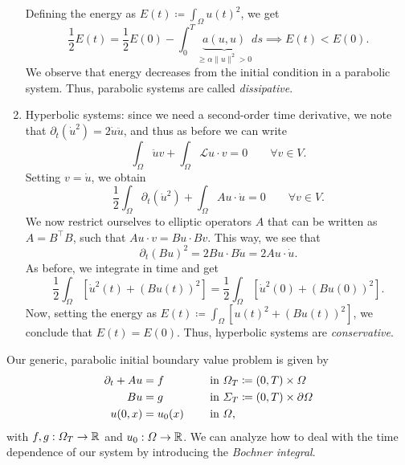 \begin{enumerate}
    Defining the energy as $E(t) \coloneqq \int_\Omega u(t)^2$, we get
    \begin{equation}
        \frac{1}{2}E(t) = \frac{1}{2}E(0) - \int_0^T \underbrace{a(u,u)}_{\geq \alpha\|u\|^2>0} ds \implies \boxed{E(t) < E(0)}.
    \end{equation}
    We observe that energy decreases from the initial condition in a parabolic system. Thus, parabolic systems are called \emph{dissipative}.
    \item Hyperbolic systems: since we need a second-order time derivative, we note that $\partial_t(\dot{u}^2) = 2\dot{u}\ddot{u}$, and thus as before we can write
    \begin{equation}
        \int_\Omega \ddot{u}v + \int_\Omega \mathcal{L}u\cdot v = 0 \qquad \forall v\in V.
    \end{equation}
    Setting $v=\dot{u}$, we obtain
    \begin{equation}
        \frac{1}{2}\int_\Omega \partial_t (\dot{u}^2) + \int_\Omega Au\cdot \dot{u} = 0 \qquad \forall v\in V.
    \end{equation}
    We now restrict ourselves to elliptic operators $A$ that can be written as $A=B^\top B$, such that $Au\cdot v = Bu\cdot Bv$. This way, we see that 
    \begin{equation}
        \partial_t (Bu)^2 = 2Bu \cdot B\dot{u} = 2Au\cdot \dot{u}.
    \end{equation}
    As before, we integrate in time and get 
    \begin{equation}
        \frac{1}{2} \int_\Omega \left[\dot{u}^2(t) + (Bu(t))^2\right] = \frac{1}{2} \int_\Omega \left[\dot{u}^2(0) + (Bu(0))^2\right].
    \end{equation}
    Now, setting the energy as $E(t)  \coloneqq  \int_\Omega \left[u(t)^2 + (Bu(t))^2\right]$, we conclude that $E(t) = E(0)$. Thus, hyperbolic systems are \emph{conservative}.
\end{enumerate}
Our generic, parabolic initial boundary value problem is given by
\begin{equation}\label{eq:parabolic-IBVP}
    \begin{aligned}
        \partial_t + Au &= f &&\quad \tin\Omega_T  \coloneqq  (0,T) \times \Omega\\
        \hfill Bu &= g &&\quad \tin\Sigma_T  \coloneqq  (0,T) \times \partial\Omega\\
        \hfill u(0,x)&= u_0(x) &&\quad \tin\Omega,
    \end{aligned}
\end{equation}
with $f,g:\Omega_T\to \mathbb{R}$ and $u_0:\Omega\to\mathbb{R}$. We can analyze how to deal with the time dependence of our system by introducing the \emph{Bochner integral}.


